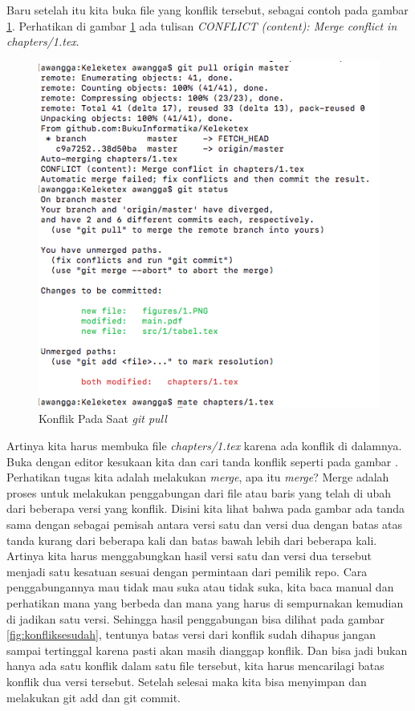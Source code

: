 Baru setelah itu kita buka file yang konflik tersebut, sebagai contoh pada gambar \ref{fig:fileyangkonflik}. Perhatikan di gambar \ref{fig:fileyangkonflik} ada tulisan \textit{CONFLICT (content): Merge conflict in chapters/1.tex}. 

\begin{figure}[!htbp]
\centerline{\includegraphics[width=.75\textwidth]{Figures/fileyangkonflik}}
\caption{Konflik Pada Saat \textit{git pull}}
\label{fig:fileyangkonflik}
\end{figure}

Artinya kita harus membuka file \textit{chapters/1.tex} karena ada konflik di dalamnya. Buka dengan editor kesukaan kita dan cari tanda konflik seperti pada gambar \label{fig:konfliksebelum}. Perhatikan tugas kita adalah melakukan \textit{merge}, apa itu \textit{merge}? Merge adalah proses untuk melakukan penggabungan dari file atau baris yang telah di ubah dari beberapa versi yang konflik. Disini kita lihat bahwa pada gambar \label{fig:konfliksebelum} ada tanda sama dengan sebagai pemisah antara versi satu dan versi dua dengan batas atas tanda kurang dari beberapa kali dan batas bawah lebih dari beberapa kali. Artinya kita harus menggabungkan hasil versi satu dan versi dua tersebut menjadi satu kesatuan sesuai dengan permintaan dari pemilik repo. Cara penggabungannya mau tidak mau suka atau tidak suka, kita baca manual dan perhatikan mana yang berbeda dan mana yang harus di sempurnakan kemudian di jadikan satu versi. Sehingga hasil penggabungan bisa dilihat pada gambar \ref{fig:konfliksesudah}, tentunya batas versi dari konflik sudah dihapus jangan sampai tertinggal karena pasti akan masih dianggap konflik. Dan bisa jadi bukan hanya ada satu konflik dalam satu file tersebut, kita harus mencarilagi batas konflik dua versi tersebut. Setelah selesai maka kita bisa menyimpan dan melakukan git add dan git commit.


